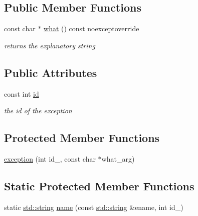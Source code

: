 \subsection*{Public Member Functions}
\begin{DoxyCompactItemize}
\item 
const char $\ast$ \hyperlink{classnlohmann_1_1detail_1_1exception_a56e006c6ac214875115049ae5b9b569a}{what} () const noexceptoverride
\begin{DoxyCompactList}\small\item\em returns the explanatory string \end{DoxyCompactList}\end{DoxyCompactItemize}
\subsection*{Public Attributes}
\begin{DoxyCompactItemize}
\item 
const int \hyperlink{classnlohmann_1_1detail_1_1exception_a0d4589a3fb54e81646d986c05efa3b9a}{id}
\begin{DoxyCompactList}\small\item\em the id of the exception \end{DoxyCompactList}\end{DoxyCompactItemize}
\subsection*{Protected Member Functions}
\begin{DoxyCompactItemize}
\item 
\hyperlink{classnlohmann_1_1detail_1_1exception_ae323ad0d53bc724414c2233164e65657}{exception} (int id\+\_\+, const char $\ast$what\+\_\+arg)
\end{DoxyCompactItemize}
\subsection*{Static Protected Member Functions}
\begin{DoxyCompactItemize}
\item 
static \hyperlink{namespacenlohmann_1_1detail_a90aa5ef615aa8305e9ea20d8a947980fab45cffe084dd3d20d928bee85e7b0f21}{std\+::string} \hyperlink{classnlohmann_1_1detail_1_1exception_abf41a7e9178356314082284e6cfea278}{name} (const \hyperlink{namespacenlohmann_1_1detail_a90aa5ef615aa8305e9ea20d8a947980fab45cffe084dd3d20d928bee85e7b0f21}{std\+::string} \&ename, int id\+\_\+)
\end{DoxyCompactItemize}


